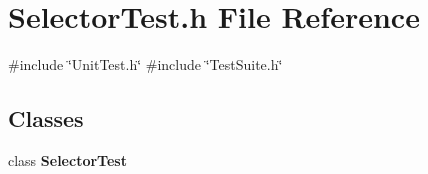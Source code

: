\section{Selector\+Test.\+h File Reference}
\label{SelectorTest_8h}
{\ttfamily \#include \char`\"{}Unit\+Test.\+h\char`\"{}}\newline
{\ttfamily \#include \char`\"{}Test\+Suite.\+h\char`\"{}}\newline
\subsection*{Classes}
\begin{DoxyCompactItemize}
\item 
class \textbf{ Selector\+Test}
\end{DoxyCompactItemize}
